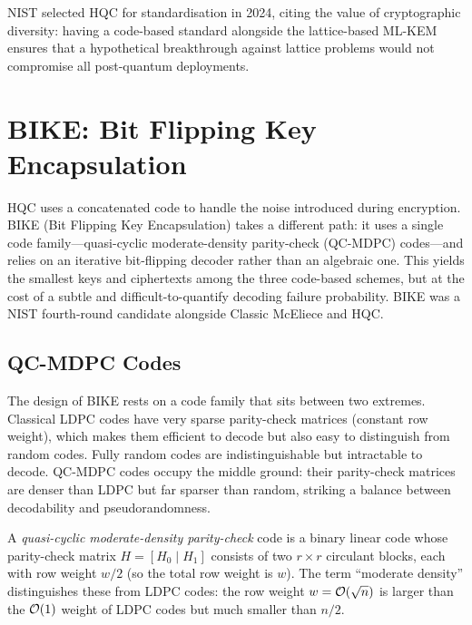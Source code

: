 NIST selected HQC for standardisation in 2024, citing the value of cryptographic diversity: having a code-based standard alongside the lattice-based ML-KEM ensures that a hypothetical breakthrough against lattice problems would not compromise all post-quantum deployments.


\section{BIKE: Bit Flipping Key Encapsulation}
\label{sec:bike}

HQC uses a concatenated code to handle the noise introduced during encryption.  BIKE (Bit Flipping Key Encapsulation) takes a different path: it uses a single code family---quasi-cyclic moderate-density parity-check (QC-MDPC) codes---and relies on an iterative bit-flipping decoder rather than an algebraic one.  This yields the smallest keys and ciphertexts among the three code-based schemes, but at the cost of a subtle and difficult-to-quantify decoding failure probability.  BIKE was a NIST fourth-round candidate alongside Classic McEliece and HQC.

\subsection{QC-MDPC Codes}
\label{subsec:qc-mdpc}

The design of BIKE rests on a code family that sits between two extremes.  Classical LDPC codes have very sparse parity-check matrices (constant row weight), which makes them efficient to decode but also easy to distinguish from random codes.  Fully random codes are indistinguishable but intractable to decode.  QC-MDPC codes occupy the middle ground: their parity-check matrices are denser than LDPC but far sparser than random, striking a balance between decodability and pseudorandomness.

\begin{definition}
\label{def:qc-mdpc}
A \emph{quasi-cyclic moderate-density parity-check} code is a binary linear code whose parity-check matrix $H = [H_0 \mid H_1]$ consists of two $r \times r$ circulant blocks, each with row weight $w/2$ (so the total row weight is $w$).  The term ``moderate density'' distinguishes these from LDPC codes: the row weight $w = \mathcal{O}(\sqrt{n})$ is larger than the $\mathcal{O}(1)$ weight of LDPC codes but much smaller than $n/2$.
\end{definition}

